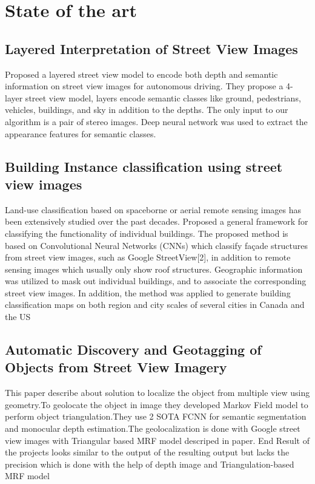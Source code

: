 
\chapter{State of the art}

\section{Layered Interpretation of Street View Images} 
Proposed a layered street view model to encode both depth and semantic information on street view images for autonomous driving. They propose a 4-layer street view model, layers encode semantic classes like ground, pedestrians, vehicles, buildings, and sky in addition to the depths. The only input to our algorithm is a pair of stereo images. Deep neural network was used to extract the appearance features for semantic classes.

\section{Building Instance classification using street view images \cite{Kang2018}} 
Land-use classification based on spaceborne or aerial remote sensing images has been extensively studied over the past decades. Proposed a general framework for classifying the functionality of individual buildings. The proposed method is based on Convolutional Neural Networks (CNNs) which classify façade structures from street view images, such as Google StreetView[2], in addition to remote sensing images which usually only show roof structures. Geographic information was utilized to mask out individual buildings, and to associate the corresponding street view images. In addition, the method was applied to generate building classification maps on both region and city scales of several cities in Canada and the US

\section{Automatic Discovery and Geotagging of Objects from Street View Imagery}
This paper describe about solution to localize the object from multiple view using geometry.To geolocate the object in image they developed Markov Field model to perform object triangulation.They use 2 SOTA  FCNN for semantic segmentation and monocular depth estimation.The geolocalization is done with Google street view images with Triangular based MRF model descriped in paper. End Result of the projects looks similar to the output of the resulting output but lacks the precision which is done with the help of depth image and Triangulation-based MRF model

